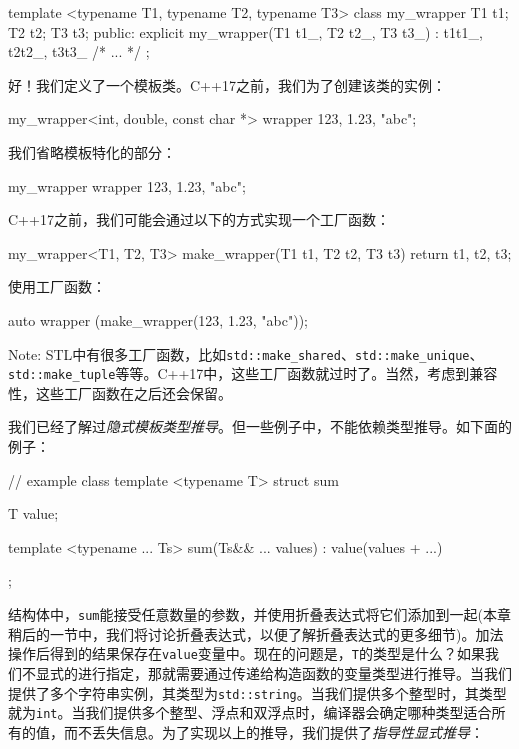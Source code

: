 \begin{codebox}[cpp]
template <typename T1, typename T2, typename T3>
class my_wrapper {
  T1 t1;
  T2 t2;
  T3 t3;
public:
  explicit my_wrapper(T1 t1_, T2 t2_, T3 t3_)
  : t1{t1_}, t2{t2_}, t3{t3_}
  {}
/* ... */
};
\end{codebox}

好！我们定义了一个模板类。C++17之前，我们为了创建该类的实例：

\begin{codebox}[cpp]
my_wrapper<int, double, const char *> wrapper {123, 1.23, "abc"};
\end{codebox}

我们省略模板特化的部分：

\begin{codebox}[cpp]
my_wrapper wrapper {123, 1.23, "abc"};
\end{codebox}

C++17之前，我们可能会通过以下的方式实现一个工厂函数：

\begin{codebox}[cpp]
my_wrapper<T1, T2, T3> make_wrapper(T1 t1, T2 t2, T3 t3)
{
  return {t1, t2, t3};
}
\end{codebox}

使用工厂函数：

\begin{codebox}[cpp]
auto wrapper (make_wrapper(123, 1.23, "abc"));
\end{codebox}

\begin{myInfoBox}
Note: STL中有很多工厂函数，比如\texttt{std::make\_shared}、\texttt{std::make\_unique}、\texttt{std::make\_tuple}等等。C++17中，这些工厂函数就过时了。当然，考虑到兼容性，这些工厂函数在之后还会保留。
\end{myInfoBox}


我们已经了解过\emph{隐式模板类型推导}。但一些例子中，不能依赖类型推导。如下面的例子：

\begin{codebox}[cpp]
// example class
template <typename T>
struct sum{
    T value;
    
    template <typename ... Ts>
    sum(Ts&& ... values) : value{(values + ...)} {}
};
\end{codebox}

结构体中，\texttt{sum}能接受任意数量的参数，并使用折叠表达式将它们添加到一起(本章稍后的一节中，我们将讨论折叠表达式，以便了解折叠表达式的更多细节)。加法操作后得到的结果保存在\texttt{value}变量中。现在的问题是，\texttt{T}的类型是什么？如果我们不显式的进行指定，那就需要通过传递给构造函数的变量类型进行推导。当我们提供了多个字符串实例，其类型为\texttt{std::string}。当我们提供多个整型时，其类型就为\texttt{int}。当我们提供多个整型、浮点和双浮点时，编译器会确定哪种类型适合所有的值，而不丢失信息。为了实现以上的推导，我们提供了\emph{指导性显式推导}：


